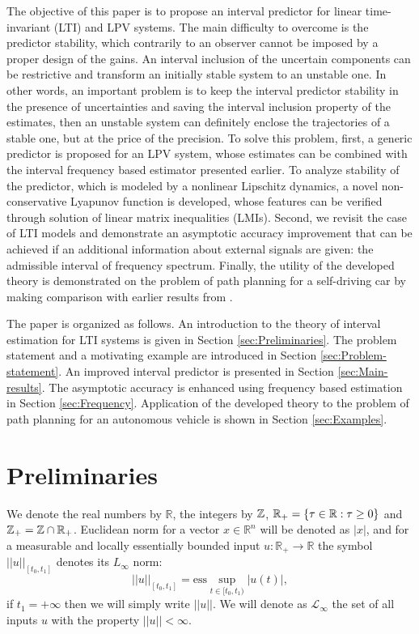 \documentclass[letterpaper, 10 pt, conference]{ieeeconf}
\theoremstyle{plain}
\theoremstyle{definition}
\theoremstyle{plain}
\theoremstyle{plain}
\theoremstyle{remark}
\begin{document}
The objective of this paper is to propose an interval predictor for linear time-invariant (LTI) and LPV systems. The main difficulty to overcome is the predictor stability, which contrarily to an observer cannot be imposed by a proper design of the gains. An interval inclusion of the uncertain components can be restrictive and transform an initially stable system to an unstable one. In other words, an important problem is to keep the interval predictor stability in the presence of uncertainties and saving the interval inclusion property of the estimates, then an unstable system can definitely enclose the trajectories of a stable one, but at the price of the precision. To solve this problem, first, a generic predictor is proposed for an LPV system, whose estimates can be combined with the interval frequency based estimator presented earlier. To analyze stability of the predictor, which is modeled by a nonlinear Lipschitz dynamics, a novel non-conservative Lyapunov function is developed, whose features can be verified through solution of linear matrix inequalities (LMIs). Second, we revisit the case of LTI models and demonstrate an asymptotic accuracy improvement that can be achieved if an additional information about external signals are given: the admissible interval of frequency spectrum. Finally, the utility of the developed theory is demonstrated on the problem of path planning for a self-driving car by making comparison with earlier results from \cite{Leurent2018}.

The paper is organized as follows. An introduction to the theory of interval estimation for LTI systems is given in Section \ref{sec:Preliminaries}. The problem statement and a motivating example are introduced in Section \ref{sec:Problem-statement}. An improved interval predictor is presented in Section \ref{sec:Main-results}. The asymptotic accuracy is enhanced using frequency based estimation in Section \ref{sec:Frequency}. Application of the developed theory to the problem of path planning for an autonomous vehicle is shown in Section \ref{sec:Examples}.

\section{\label{sec:Preliminaries} Preliminaries}

We denote the real numbers  by $\mathbb{R}$, the integers by $\mathbb{Z}$, $\mathbb{R}_{+}=\{\tau\in\mathbb{R}:\tau\ge0\}$ and $\mathbb{Z}_{+}=\mathbb{Z}\cap\mathbb{R}_{+}$. Euclidean norm for a vector $x\in\mathbb{R}^{n}$ will be denoted as $|x|$, and for a measurable and locally essentially bounded input $u:\mathbb{R}_{+}\to\mathbb{R}$ the symbol $||u||_{[t_{0},t_{1}]}$ denotes its $L_{\infty}$ norm:
\[
||u||_{[t_{0},t_{1}]}=\text{ess}\sup_{t\in[t_{0},t_{1})}|u(t)|,
\]
if $t_{1}=+\infty$ then we will simply write $||u||$. We will denote as $\mathcal{L}_{\infty}$ the set of all inputs $u$ with the property $||u||<\infty$. 
\end{document}
